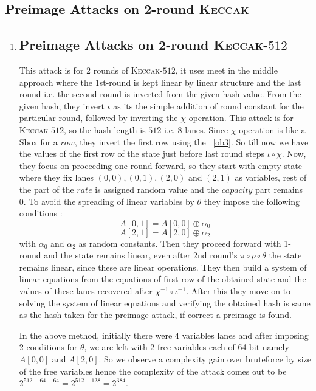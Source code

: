 \documentclass[runningheads]{llncs}
\newcommand{\KECCAK}{\mbox{\textsc{Keccak}}}
\begin{document}
\subsection{Preimage Attacks on 2-round \KECCAK}
\begin{enumerate}
	\item \subsection{Preimage Attacks on 2-round \KECCAK-$512$}
		This attack is for 2 rounds of \KECCAK-$512$, it uses meet in the middle approach where the 1st-round is kept linear by linear structure and the last round i.e. the second round is inverted from the given hash value. From the given hash, they invert $\iota$ as its the simple addition of round constant for the particular round, followed by inverting the $\chi$ operation. This attack is for \KECCAK-$512$, so the hash length is $512$ i.e. $8$ lanes. Since $\chi$ operation is like a Sbox for a $row$, they invert the first row using the ~\ref{ob3}. So till now we have the values of the first row of the state just before last round steps $\iota \circ \chi$. Now, they focus on proceeding one round forward, so they start with empty state where they fix lanes $(0,0), (0,1), (2,0) $ and $(2,1)$ as variables, rest of the part of the $rate$ is assigned random value and the $capacity$ part remains 0. To avoid the spreading of linear variables by $\theta$ they impose the following conditions : 
		\[
			A[0, 1] = A[0, 0] \oplus \alpha_{0}
		\]
		\[
			A[2, 1] = A[2, 0] \oplus \alpha_{2}
		\]
		with $\alpha_0$ and $\alpha_2$ as random constants.
		Then they proceed forward with 1-round and the state remains linear, even after 2nd round's $\pi \circ \rho \circ \theta$ the state remains linear, since these are linear operations. They then build a system of linear equations from the equations of first row of the obtained state and the values of these lanes recovered after $\chi^{-1} \circ \iota^{-1}$. After this they move on to solving the system of linear equations and verifying the obtained hash is same as the hash taken for the preimage attack, if correct a preimage is found.
		
		In the above method, initially there were 4 variables lanes and after imposing 2 conditions for $\theta$, we are left with 2 free variables each of 64-bit namely $A[0,0]$ and $A[2, 0]$. So we observe a complexity gain over bruteforce by size of the free variables hence the complexity of the attack comes out to be $2^{512 - 64 - 64} = 2^{512 - 128} = 2^{384}$.


\end{enumerate}
\end{document}
